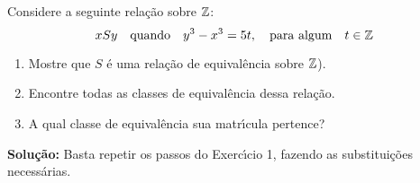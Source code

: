 \documentclass[12pt]{exam}
\begin{document}
	\questao{} Considere a seguinte rela\c{c}\~ao sobre $\mathbb{Z}$:
	\[
		x S y\quad  \mbox{quando}\quad y^3 - x^3 = 5t, \quad \mbox{para algum}\quad t \in \mathbb{Z}
	\]
	\begin{enumerate}[label={\arabic*})]
		\item Mostre que $S$ \'e uma rela\c{c}\~ao de equival\^encia sobre $\mathbb{Z}$).
		\item Encontre todas as classes de equival\^encia dessa rela\c{c}\~ao.
		\item A qual classe de equival\^encia sua matr{\'\i}cula pertence?
	\end{enumerate}

	\noindent\textbf{Solu\c{c}\~ao:} Basta repetir os passos do Exerc{\'\i}cio 1, fazendo as substitui\c{c}\~oes necess\'arias.
\end{document}
